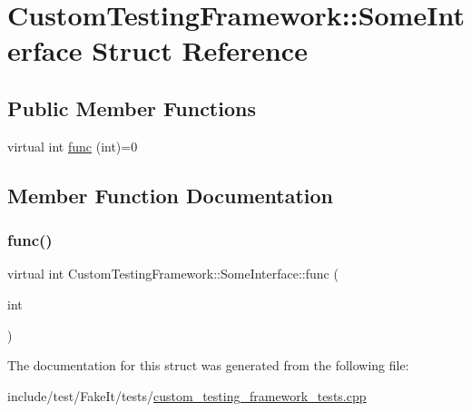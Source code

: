 \hypertarget{structCustomTestingFramework_1_1SomeInterface}{}\section{Custom\+Testing\+Framework\+::Some\+Interface Struct Reference}
\label{structCustomTestingFramework_1_1SomeInterface}
\subsection*{Public Member Functions}
\begin{DoxyCompactItemize}
\item 
virtual int \mbox{\hyperlink{structCustomTestingFramework_1_1SomeInterface_a5eaf6c9ec324b8e5d8ad4410b85ef510}{func}} (int)=0
\end{DoxyCompactItemize}


\subsection{Member Function Documentation}
\mbox{\label{structCustomTestingFramework_1_1SomeInterface_a5eaf6c9ec324b8e5d8ad4410b85ef510}} 
\subsubsection{\texorpdfstring{func()}{func()}}
{\footnotesize\ttfamily virtual int Custom\+Testing\+Framework\+::\+Some\+Interface\+::func (\begin{DoxyParamCaption}\item[{int}]{ }\end{DoxyParamCaption})\hspace{0.3cm}{\ttfamily [pure virtual]}}



The documentation for this struct was generated from the following file\+:\begin{DoxyCompactItemize}
\item 
include/test/\+Fake\+It/tests/\mbox{\hyperlink{custom__testing__framework__tests_8cpp}{custom\+\_\+testing\+\_\+framework\+\_\+tests.\+cpp}}\end{DoxyCompactItemize}
